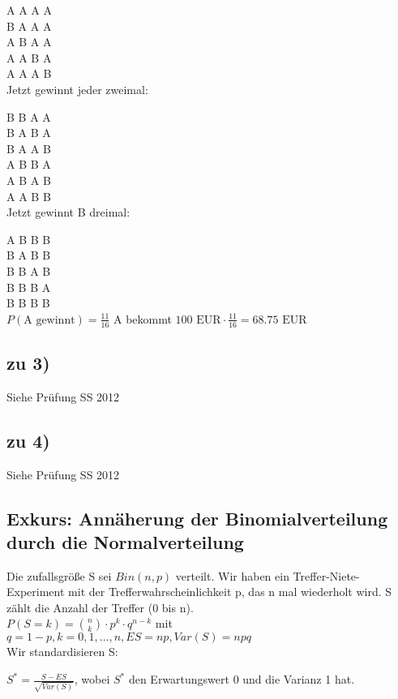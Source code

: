 \color{red}

A A A A\\
B A A A\\
A B A A\\
A A B A\\
A A A B\\

\color{black}
Jetzt gewinnt jeder zweimal:
\color{red}

B B A A\\ 
B A B A\\
B A A B\\
A B B A\\
A B A B\\
A A B B\\
\color{black}
Jetzt gewinnt B dreimal: 
\color{blue}

A B B B\\
B A B B\\
B B A B\\
B B B A\\
B B B B\\
\color{black}
$P(\textrm{A gewinnt}) = \frac{11}{16} $ A bekommt $ 100 \textrm{ EUR} \cdot \frac{11}{16} = 68.75 \textrm{ EUR}$

\subsection{zu 3)}
Siehe Prüfung SS 2012

\subsection{zu 4)}
Siehe Prüfung SS 2012

\subsection{Exkurs: Annäherung der Binomialverteilung durch die Normalverteilung}
Die zufallsgröße S sei $Bin(n,p)$ verteilt. Wir haben ein Treffer-Niete-Experiment mit der Trefferwahrscheinlichkeit p, das n mal wiederholt wird. S zählt die Anzahl der Treffer (0 bis n).\\

$P(S=k) = \binom n k \cdot p^k \cdot q^{n-k} $ mit $ q = 1-p, k=0,1,...,n, ES = np, Var(S)=npq $\\

Wir standardisieren S:

$ S^* = \frac{S - ES}{\sqrt{Var(S)}} $, wobei $S^*$ den Erwartungswert 0 und die Varianz 1 hat. 

